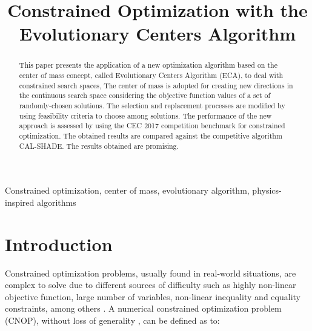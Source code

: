 \documentclass[conference]{IEEEtran}
\begin{document}
\title{Constrained Optimization with the \\Evolutionary Centers Algorithm\\
}


\author{
}

\maketitle

\begin{abstract}
This paper presents the application of a new optimization algorithm based on the 
center of mass concept, called Evolutionary Centers Algorithm (ECA), to deal with 
constrained search spaces, The center of mass is adopted for creating new directions 
in the continuous search space considering the objective function values of a set 
of randomly-chosen solutions.  The selection and replacement processes are modified 
by using feasibility criteria to choose among solutions. The performance of the 
new approach is assessed by using the CEC 2017 competition benchmark for constrained 
optimization. The obtained results are compared against the competitive algorithm 
CAL-SHADE.  The results obtained are promising.
\end{abstract}

\begin{IEEEkeywords}
Constrained optimization, center of mass, evolutionary algorithm, physics-inspired algorithms 
\end{IEEEkeywords}

\section{Introduction}
Constrained optimization problems, usually found in real-world situations, are 
complex to solve due to different sources of difficulty such as highly non-linear 
objective function, large number of variables, non-linear inequality and equality 
constraints, among others \cite{Mezura11} . A numerical constrained optimization 
problem (CNOP), without loss of generality \cite{cecCop17}, can be defined as to:\\
\end{document}
